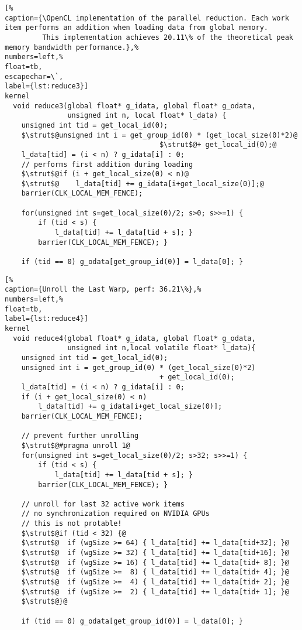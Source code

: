 \begin{lstlisting}[%                                                             
caption={\OpenCL implementation of the parallel reduction. Each work item performs an addition when loading data from global memory.
         This implementation achieves 20.11\% of the theoretical peak memory bandwidth performance.},%
numbers=left,%
float=tb,
escapechar=\`,
label={lst:reduce3}]
kernel
  void reduce3(global float* g_idata, global float* g_odata,
               unsigned int n, local float* l_data) {
    unsigned int tid = get_local_id(0);
    $\strut$@unsigned int i = get_group_id(0) * (get_local_size(0)*2)@
                                     $\strut$@+ get_local_id(0);@
    l_data[tid] = (i < n) ? g_idata[i] : 0;
    // performs first addition during loading
    $\strut$@if (i + get_local_size(0) < n)@
    $\strut$@    l_data[tid] += g_idata[i+get_local_size(0)];@
    barrier(CLK_LOCAL_MEM_FENCE);

    for(unsigned int s=get_local_size(0)/2; s>0; s>>=1) {
        if (tid < s) {
            l_data[tid] += l_data[tid + s]; }
        barrier(CLK_LOCAL_MEM_FENCE); }

    if (tid == 0) g_odata[get_group_id(0)] = l_data[0]; }
\end{lstlisting}

\begin{lstlisting}[%                                                             
caption={Unroll the Last Warp, perf: 36.21\%},%
numbers=left,%
float=tb,
label={lst:reduce4}]
kernel
  void reduce4(global float* g_idata, global float* g_odata,
               unsigned int n,local volatile float* l_data){
    unsigned int tid = get_local_id(0);
    unsigned int i = get_group_id(0) * (get_local_size(0)*2)
                                     + get_local_id(0);
    l_data[tid] = (i < n) ? g_idata[i] : 0;
    if (i + get_local_size(0) < n) 
        l_data[tid] += g_idata[i+get_local_size(0)];  
    barrier(CLK_LOCAL_MEM_FENCE);

    // prevent further unrolling
    $\strut$@#pragma unroll 1@
    for(unsigned int s=get_local_size(0)/2; s>32; s>>=1) {
        if (tid < s) {
            l_data[tid] += l_data[tid + s]; }
        barrier(CLK_LOCAL_MEM_FENCE); }

    // unroll for last 32 active work items
    // no synchronization required on NVIDIA GPUs
    // this is not protable!
    $\strut$@if (tid < 32) {@
    $\strut$@  if (wgSize >= 64) { l_data[tid] += l_data[tid+32]; }@
    $\strut$@  if (wgSize >= 32) { l_data[tid] += l_data[tid+16]; }@
    $\strut$@  if (wgSize >= 16) { l_data[tid] += l_data[tid+ 8]; }@
    $\strut$@  if (wgSize >=  8) { l_data[tid] += l_data[tid+ 4]; }@
    $\strut$@  if (wgSize >=  4) { l_data[tid] += l_data[tid+ 2]; }@
    $\strut$@  if (wgSize >=  2) { l_data[tid] += l_data[tid+ 1]; }@
    $\strut$@}@

    if (tid == 0) g_odata[get_group_id(0)] = l_data[0]; }
\end{lstlisting}

